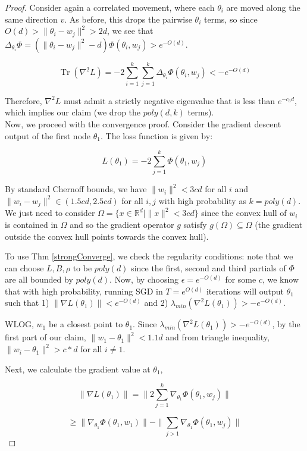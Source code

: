 \documentclass{article}
\newcommand{\R}{{\mathbb{R}}}
\DeclareMathOperator{\Tr}{Tr}
\begin{document}
\begin{proof}
Consider again a correlated movement, where each $\theta_i$ are moved along the same direction $v$. As before, this drops the pairwise $\theta_i$ terms, so since $O(d) > \|\theta_i -w_j\|^2 > 2d$, we see that $\Delta_{\theta_i} \Phi = (\|\theta_i -w_j\|^2 - d)\Phi(\theta_i,w_j) > e^{-O(d)}$. 

\[\Tr(\nabla^2 L) = -2\sum_{i=1}^k \sum_{j=1}^k \Delta_{\theta_i}\Phi(\theta_i, w_j) < -e^{-O(d)}\]

Therefore, $\nabla^2 L$ must admit a strictly negative eigenvalue that is less than $e^{-c_3 d}$, which implies our claim (we drop the $poly(d,k)$ terms).\\

Now, we proceed with the convergence proof. Consider the gradient descent output of the first node $\theta_1$. The loss function is given by:

\[L(\theta_1) =  - 2\sum_{j=1}^k \Phi(\theta_1,w_j)\]

By standard Chernoff bounds, we have $\|w_i\|^2 < 3cd$ for all $i$ and $\|w_i -w_j\|^2 \in (1.5cd, 2.5cd)$ for all $i, j$ with high probability as $k = poly(d)$. We just need to consider $\Omega = \{ x \in \R^d | \|x \|^2 < 3cd\}$ since the convex hull of $w_i$ is contained in $\Omega$ and so the gradient operator $g$ satisfy $g(\Omega) \subseteq \Omega$ (the gradient outside the convex hull points towards the convex hull).  

To use Thm \ref{strongConverge}, we check the regularity conditions: note that we can choose $L, B, \rho$ to be $poly(d)$ since the first, second and third partials of $\Phi$ are all bounded by $poly(d)$. Now, by choosing $\epsilon = e^{-O(d)}$ for some $c$, we know that with high probability, running SGD in $T = e^{O(d)}$ iterations will output $\theta_1$ such that 1) $\|\nabla L (\theta_1)\| < e^{-O(d)}$ and 2) $\lambda_{min}(\nabla^2L(\theta_1)) > -e^{-O(d)}$.

WLOG, $w_1$ be a closest point to $\theta_1$. Since  $\lambda_{min}(\nabla^2L(\theta_1)) > -e^{-O(d)}$, by the first part of our claim, $\|w_1 - \theta_1\|^2 < 1.1d$ and from triangle inequality, $\|w_i - \theta_1 \|^2 > c*d$ for all $i \neq 1$. 

Next, we calculate the gradient value at $\theta_1$, 

\[\|\nabla L(\theta_1)\| = \|2\sum_{j=1}^k \nabla_{\theta_1}\Phi(\theta_1,w_j)\|\]

\[ \geq \|\nabla_{\theta_1} \Phi(\theta_1,w_1) \| - \|\sum_{j>1} \nabla_{\theta_1}\Phi(\theta_1,w_j)\|\]


\end{proof}
\end{document}
